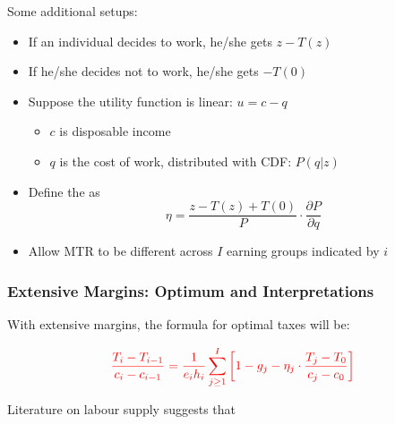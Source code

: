             Some additional setups:
            \begin{itemize}
                \item If an individual decides to work, he/she gets $z-T(z)$
                \item If he/she decides not to work, he/she gets $-T(0)$
                \item Suppose the utility function is linear: $u=c-q$
                \begin{itemize}
                    \item $c$ is disposable income
                    \item $q$ is the cost of work, distributed with CDF: $P(q|z)$
                \end{itemize}
                \item Define the  as $$\eta = \frac{z-T(z)+T(0)}{P} \cdot \frac{\partial P}{\partial q}$$
                \item Allow MTR to be different across $I$ earning groups indicated by $i$
            \end{itemize}

        \subsubsection{Extensive Margins: Optimum and Interpretations}

            With extensive margins, the formula for optimal taxes will be:
            
            \begin{equation}
                \color{red}
                \frac{T_i - T_{i-1}}{c_i - c_{i-1}} = \frac{1}{e_i h_i} \sum_{j\geq 1}^I \left[ 1 - g_j -\eta_j \cdot \frac{T_j - T_0}{c_j - c_0} \right]
            \end{equation}
            
            Literature on labour supply suggests that 

        